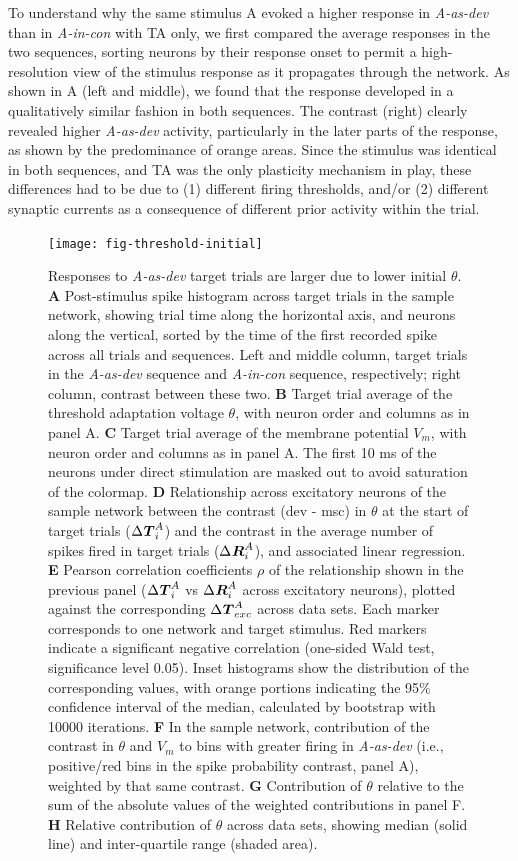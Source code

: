 \documentclass[9pt,lineno,onehalfspacing]{elife}
\newcommand{\dev}{\textit{A-as-dev}}
\newcommand{\msc}{\textit{A-in-con}}
\newcommand{\std}{\textit{A-as-std}}
\newcommand{\ifstringequal}[4]{%
  \ifnum\pdfstrcmp{#1}{#2}=0
  #3%
  \else
  #4%
  \fi
}
\newcommand{\seqreplace}[1]{\ifstringequal{dev}{#1}{\dev}{%
    \ifstringequal{std}{#1}{\std}{%
        \ifstringequal{msc}{#1}{\msc}{#1}%
    }%
}}
\newcommand{\R}[3][]{{}^{\seqreplace{#1}}_{}\boldsymbol R^{#2}_{#3}}
\newcommand{\T}[3][]{{}^{\seqreplace{#1}}_{}\boldsymbol T^{#2}_{#3}}
\begin{document}
To understand why the same stimulus A evoked a higher response in \dev{} than in \msc{} with TA only, we first compared the average responses in the two sequences, sorting neurons by their response onset to permit a high-resolution view of the stimulus response as it propagates through the network. As shown in A (left and middle), we found that the response developed in a qualitatively similar fashion in both sequences. The contrast (right) clearly revealed higher \dev{} activity, particularly in the later parts of the response, as shown by the predominance of orange areas. Since the stimulus was identical in both sequences, and TA was the only plasticity mechanism in play, these differences had to be due to (1) different firing thresholds, and/or (2) different synaptic currents as a consequence of different prior activity within the trial.

\begin{figure}
    \texttt{[image: fig-threshold-initial]}
    \caption{%
        Responses to \dev{} target trials are larger due to lower initial $\theta$.
        \textbf{A} Post-stimulus spike histogram across target trials in the sample network, showing trial time along the horizontal axis, and neurons along the vertical, sorted by the time of the first recorded spike across all trials and sequences. Left and middle column, target trials in the \dev{} sequence and \msc{} sequence, respectively; right column, contrast between these two.
        \textbf{B} Target trial average of the threshold adaptation voltage $\theta$, with neuron order and columns as in panel A.
        \textbf{C} Target trial average of the membrane potential $V_m$, with neuron order and columns as in panel A. The first 10 ms of the neurons under direct stimulation are masked out to avoid saturation of the colormap.
        \textbf{D} Relationship across excitatory neurons of the sample network between the contrast (dev - msc) in $\theta$ at the start of target trials ($\Delta \T{A}{i}$) and the contrast in the average number of spikes fired in target trials ($\Delta \R{A}{i}$), and associated linear regression.
        \textbf{E} Pearson correlation coefficients $\rho$ of the relationship shown in the previous panel ($\Delta \T{A}{i}$ vs $\Delta \R{A}{i}$ across excitatory neurons), plotted against the corresponding $\Delta \T{A}{exc}$ across data sets. Each marker corresponds to one network and target stimulus. Red markers indicate a significant negative correlation (one-sided Wald test, significance level 0.05). Inset histograms show the distribution of the corresponding values, with orange portions indicating the 95\% confidence interval of the median, calculated by bootstrap with 10000 iterations.
        \textbf{F} In the sample network, contribution of the contrast in $\theta$ and $V_m$ to bins with greater firing in \dev{} (i.e., positive/red bins in the spike probability contrast, panel A), weighted by that same contrast.
        \textbf{G} Contribution of $\theta$ relative to the sum of the absolute values of the weighted contributions in panel F.
        \textbf{H} Relative contribution of $\theta$ across data sets, showing median (solid line) and inter-quartile range (shaded area).
    }
    \label{fig:threshold-initial}
\end{figure}
\end{document}
